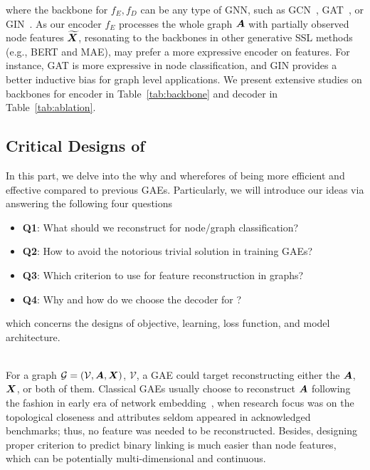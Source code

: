 {\noindent where the backbone for $f_E,f_D$ can be any type of GNN, such as GCN~\cite{thomas2017gcn}, GAT~\cite{petar2018gat}, or GIN~\cite{xu2019powerful}. As our encoder $f_E$ processes the whole graph ${\bm{A}}$ with partially observed node features $\widetilde{{\bm{X}}}$, resonating to the backbones in other generative SSL methods (e.g., BERT and MAE), \model may prefer a more expressive encoder on features. For instance, GAT is more expressive in node classification, and GIN provides a better inductive bias for graph level applications. We present extensive studies on backbones for encoder in Table~\ref{tab:backbone} and decoder in Table~\ref{tab:ablation}. 


\subsection{Critical Designs of \model}
In this part, we delve into the why and wherefores of \model being more efficient and effective compared to previous GAEs. Particularly, we will introduce our ideas via answering the following four questions

\begin{itemize}[leftmargin=*,itemsep=0pt,parsep=0.5em,topsep=0.3em,partopsep=0.3em]
    \item \textbf{Q1}: What should we reconstruct for node/graph classification?
    \item \textbf{Q2}: How to avoid the notorious trivial solution in training GAEs?
    \item \textbf{Q3}: Which criterion to use for feature reconstruction in graphs?
    \item \textbf{Q4}: Why and how do we choose the decoder for \model?
\end{itemize}

which concerns the designs of objective, learning, loss function, and model architecture.

~\\

For a graph $\mathcal{G}=(\mathcal{V}, {\bm{A}}, {\bm{X}})$, $\mathcal{V}$, a GAE could target reconstructing either the ${\bm{A}}$, ${\bm{X}}$, or both of them. Classical GAEs usually choose to reconstruct ${\bm{A}}$ following the fashion in early era of network embedding~\cite{perozzi2014deepwalk,grover2016node2vec,tang2015line}, when research focus was on the topological closeness and attributes seldom appeared in acknowledged benchmarks; thus, no feature was needed to be reconstructed. Besides, designing proper criterion to predict binary linking is much easier than node features, which can be potentially multi-dimensional and continuous.

}
